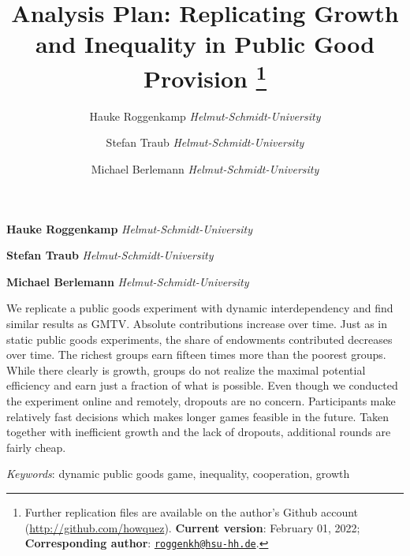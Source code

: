 \documentclass[11pt,]{article}
\title{Analysis Plan: Replicating Growth and Inequality in Public Good
Provision \thanks{Further replication files are available on the
author's Github account (\url{http://github.com/howquez}).
\textbf{Current version}: February 01, 2022; \textbf{Corresponding
author}:
\href{mailto:roggenkh@hsu-hh.de}{\nolinkurl{roggenkh@hsu-hh.de}}.}  }
\author{\Large Hauke
Roggenkamp\vspace{0.05in} \newline\normalsize\emph{Helmut-Schmidt-University}   \and \Large Stefan
Traub\vspace{0.05in} \newline\normalsize\emph{Helmut-Schmidt-University}   \and \Large Michael
Berlemann\vspace{0.05in} \newline\normalsize\emph{Helmut-Schmidt-University}  }
\date{}
\newcommand*{\authorfont}{\fontfamily{phv}\selectfont}
\renewenvironment{abstract}
 {{%
    \setlength{\leftmargin}{0mm}
    \setlength{\rightmargin}{\leftmargin}%
  }%
  \relax}
 {\endlist}
\begin{document}
	
%    


{%
\setlength{\parindent}{0pt}
\thispagestyle{plain}
{\fontsize{18}{20}\selectfont\raggedright 
\maketitle  %

}

{
   \vskip 13.5pt\relax \normalsize\fontsize{11}{12} 
\textbf{\authorfont Hauke
Roggenkamp} \hskip 15pt \emph{\small Helmut-Schmidt-University}   \par \textbf{\authorfont Stefan
Traub} \hskip 15pt \emph{\small Helmut-Schmidt-University}   \par \textbf{\authorfont Michael
Berlemann} \hskip 15pt \emph{\small Helmut-Schmidt-University}   

}

}








\begin{abstract}

    \hbox{\vrule height .2pt width 39.14pc}

    \vskip 8.5pt %

\noindent We replicate a public goods experiment with dynamic
interdependency and find similar results as GMTV. Absolute contributions
increase over time. Just as in static public goods experiments, the
share of endowments contributed decreases over time. The richest groups
earn fifteen times more than the poorest groups. While there clearly is
growth, groups do not realize the maximal potential efficiency and earn
just a fraction of what is possible. Even though we conducted the
experiment online and remotely, dropouts are no concern. Participants
make relatively fast decisions which makes longer games feasible in the
future. Taken together with inefficient growth and the lack of dropouts,
additional rounds are fairly cheap.


\vskip 8.5pt \noindent \emph{Keywords}: dynamic public goods game,
inequality, cooperation, growth \par

    \hbox{\vrule height .2pt width 39.14pc}



\end{abstract}
\end{document}
